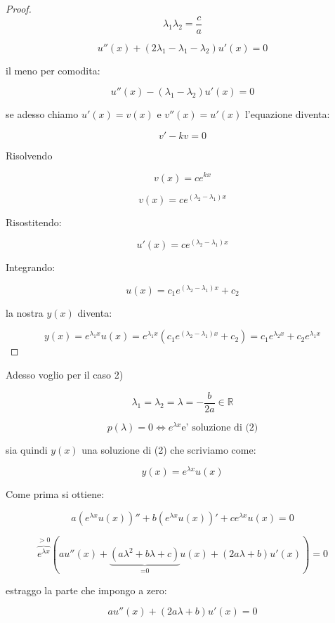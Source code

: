\documentclass[11pt]{article}
\begin{document}
\begin{proof}
        \[
            \lambda_1  \lambda_2 = \frac{c}{a}
        \]

        \[
            u''(x) + (2 \lambda_1 - \lambda_1 - \lambda_2)u'(x) = 0
        \]

        il meno per comodita:

        \[
            u''(x) - (\lambda_1 - \lambda_2)u'(x) = 0
        \]

        se adesso chiamo $u'(x)=v(x)$ e $v''(x) = u'(x)$ l'equazione diventa:

        \[
            v' -kv = 0
        \]

        Risolvendo 

        \[
            v(x) = ce ^{kx}
        \]

        \[
            v(x) = c e^{(\lambda_2 - \lambda_1)x}
        \]

        Risostitendo:

        \[
            u'(x) = c e ^{(\lambda_2- \lambda_1)x}
        \]

        Integrando:

        \[
            u(x)  = c_1 e ^{(\lambda_2 - \lambda_1)x}+c_2
        \]
        
        la nostra $y(x)$ diventa:

        \[
            y(x) = e ^{\lambda_1 x}u(x) = e ^{\lambda_1 x}( c_1 e ^{(\lambda_2 - \lambda_1)x}+c_2) = c_1 e ^{\lambda_2 x}+ c_2 e ^{\lambda_1 x}
        \]


\end{proof}

Adesso voglio per il caso 2)

\[
    \lambda_1 = \lambda_2 = \lambda = -\frac{b}{2a} \in \mathbb{R}
\]
   
\[
    p(\lambda) =0 \Leftrightarrow e ^{\lambda x} \text{e' soluzione di (2)}
\]

sia quindi $y(x)$ una soluzione di (2) che scriviamo come:

\[
    y(x) = e ^{\lambda x}u(x) 
\]

Come prima si ottiene:

\[
    a(e ^{\lambda x}u(x) )''+ b(e ^{\lambda x}u(x))' + c e ^{\lambda x}u(x)=0
\]

\[
    \overbrace{e ^{\lambda x}}^{>0}(a u''(x) + \underbrace{(a \lambda^{2}+b \lambda +c )}_\text{=0} u(x) + (2a \lambda+b)u'(x))=0
\]

estraggo la parte che impongo a zero:

\[
    au''(x) + (2a \lambda+b)u'(x) = 0
\]
\end{document}
